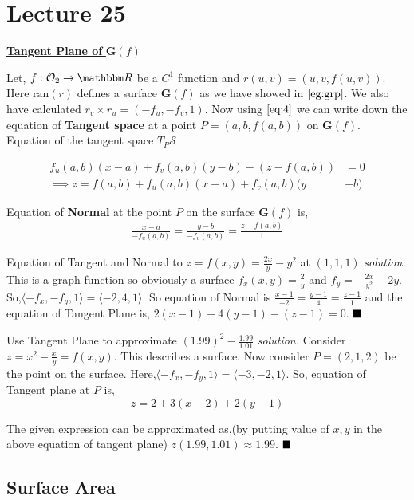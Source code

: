 \documentclass[Analysis-3]{subfiles}
\begin{document}
\chapter*{Lecture 25} %
\setcounter{chapter}{25} %
\setcounter{section}{0}
\begin{center}
  \large \underline{ \textbf{Tangent Plane of }$\textbf{G}(f)$ }
\end{center}

Let, $f : \mathcal{O}_2 \to \R$ be a $C^1$ function and $r(u,v) = (u,v,f(u,v))$. Here $\text{ran}(r)$ defines a surface $\textbf{G}(f)$ as we have showed in $\ref{eg:grp}$. We also have calculated $r_v\times r_u = (-f_u,-f_v,1)$. Now using $\ref{eq:4}$ we can write down the equation of \textbf{Tangent space} at a point $P = (a,b,f(a,b))$ on $\textbf{G}(f)$. Equation of the tangent space $T_P \mathcal{S}$ 

\begin{align}\label{eq:tp} 
    f_u(a,b)(x-a) + f_v(a,b)(y-b)-(z-f(a,b)) &= 0 \\
    \implies z = f(a,b) + f_u(a,b)(x-a) + f_v(a,b)(y &-b) 
\end{align}

Equation of \textbf{Normal} at the point $P$ on the surface $\textbf{G}(f)$ is,
\begin{align}\label{eq:np}
    \frac{x-a}{-f_u(a,b)} = \frac{y-b}{-f_v(a,b)} = \frac{z-f(a,b)}{1} 
\end{align}

\begin{Eg}{Equation of Tangent and Normal to $z = f(x,y) = \frac{2x}{y}-y^2$ at $(1,1,1)$}{}
    \textit{solution.} This is a graph function so obviously a surface $f_x(x,y) = \frac{2}{y}$ and $f_y = -\frac{2x}{y^2} -2y$. So,$\langle -f_x,- f_y,1 \rangle = \langle -2,4,1\rangle$. So equation of Normal 
 is $\frac{x-1}{-2}=\frac{y-1}{4}=\frac{z-1}{1}$ and the equation of Tangent Plane is,
  $ 2(x-1)-4(y-1) -(z-1) = 0$. $\hfill \blacksquare $ 
\end{Eg}

\begin{Eg}{Use Tangent Plane to approximate $(1.99)^2 - \frac{1.99}{1.01}$}{}
    \textit{solution.} Consider $z = x^2 - \frac{x}{y} = f(x,y)$. This describes a surface. Now consider $P=(2,1,2)$ be the point on the surface. Here,$\langle -f_x,- f_y,1 \rangle = \langle -3,-2,1\rangle$. So, equation of Tangent plane at $P$ is, \[z = 2 +3(x-2) +2(y-1)\]

    The given expression can be approximated as,(by putting value of $x,y$ in the above equation of tangent plane) $z(1.99,1.01) \approx 1.99$. $\hfill \blacksquare$
\end{Eg}

\section{Surface Area}
\end{document}
